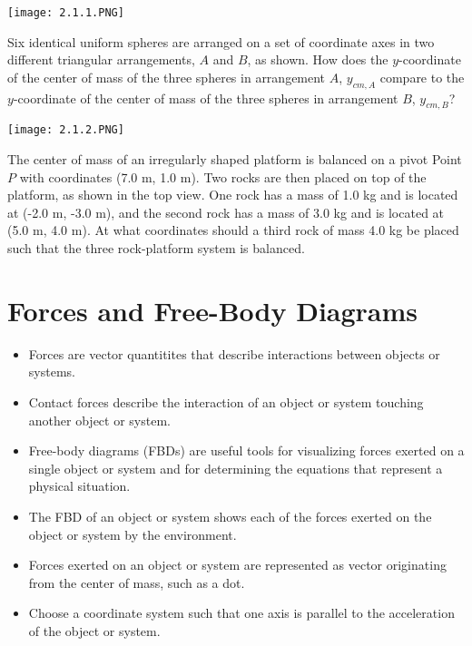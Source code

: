 \documentclass[../mech.tex]{subfiles}
\begin{document}
\ex \begin{center}
    \texttt{[image: 2.1.1.PNG]}
\end{center}
Six identical uniform spheres are arranged on a set of coordinate axes in two different triangular arrangements, $A$ and $B$, as shown. How does the $y$-coordinate of the center of mass of the 
three spheres in arrangement $A$, $y_{cm, A}$ compare to the $y$-coordinate of the center of mass of the three spheres in arrangement $B$, $y_{cm,B}$?

\ex \begin{center}
    \texttt{[image: 2.1.2.PNG]}
\end{center}
The center of mass of an irregularly shaped platform is balanced on a pivot Point $P$ with coordinates (7.0 m, 1.0 m). Two rocks are then placed on top of the platform, as shown in the top view.
One rock has a mass of 1.0 kg and is located at (-2.0 m, -3.0 m), and the second rock has a mass of 3.0 kg and is located at (5.0 m, 4.0 m). At what coordinates should a third rock of mass 4.0 kg be placed 
such that the three rock-platform system is balanced.

\section{Forces and Free-Body Diagrams}
\begin{itemize}
    \item Forces are vector quantitites that describe interactions between objects or systems.
    \item Contact forces describe the interaction of an object or system touching another object or system.
    \item Free-body diagrams (FBDs) are useful tools for visualizing forces exerted on a single object or system and for determining the equations that represent a physical situation.
    \item The FBD of an object or system shows each of the forces exerted on the object or system by the environment.
    \item Forces exerted on an object or system are represented as vector originating from the center of mass, such as a dot.
    \item Choose a coordinate system such that one axis is parallel to the acceleration of the object or system.
\end{itemize}
\end{document}
